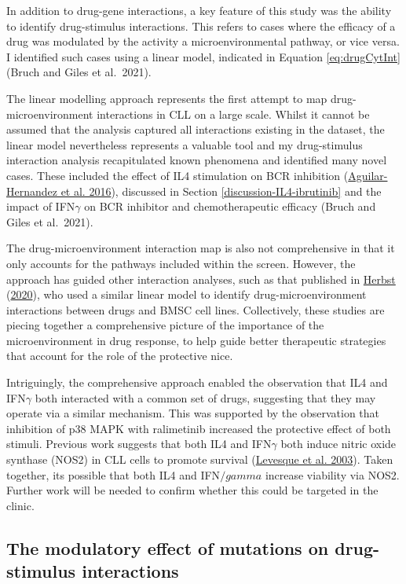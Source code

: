 \documentclass[11pt, a4paper, twosided]{book}
\begin{document}
In addition to drug-gene interactions, a key feature of this study was the ability to identify drug-stimulus interactions. This refers to cases where the efficacy of a drug was modulated by the activity a microenvironmental pathway, or vice versa. I identified such cases using a linear model, indicated in Equation \eqref{eq:drugCytInt} (Bruch and Giles et al.~2021).

The linear modelling approach represents the first attempt to map drug-microenvironment interactions in CLL on a large scale. Whilst it cannot be assumed that the analysis captured all interactions existing in the dataset, the linear model nevertheless represents a valuable tool and my drug-stimulus interaction analysis recapitulated known phenomena and identified many novel cases. These included the effect of IL4 stimulation on BCR inhibition (\protect\hyperlink{ref-AguilarHernandez2016}{Aguilar-Hernandez et al. 2016}), discussed in Section \ref{discussion-IL4-ibrutinib} and the impact of IFN\(\gamma\) on BCR inhibitor and chemotherapeutic efficacy (Bruch and Giles et al.~2021).

The drug-microenvironment interaction map is also not comprehensive in that it only accounts for the pathways included within the screen. However, the approach has guided other interaction analyses, such as that published in \protect\hyperlink{ref-HerbstThesis}{Herbst} (\protect\hyperlink{ref-HerbstThesis}{2020}), who used a similar linear model to identify drug-microenvironment interactions between drugs and BMSC cell lines. Collectively, these studies are piecing together a comprehensive picture of the importance of the microenvironment in drug response, to help guide better therapeutic strategies that account for the role of the protective nice.

Intriguingly, the comprehensive approach enabled the observation that IL4 and IFN\(\gamma\) both interacted with a common set of drugs, suggesting that they may operate via a similar mechanism. This was supported by the observation that inhibition of p38 MAPK with ralimetinib increased the protective effect of both stimuli. Previous work suggests that both IL4 and IFN\(\gamma\) both induce nitric oxide synthase (NOS2) in CLL cells to promote survival (\protect\hyperlink{ref-Levesque2003}{Levesque et al. 2003}). Taken together, its possible that both IL4 and IFN\(/gamma\) increase viability via NOS2. Further work will be needed to confirm whether this could be targeted in the clinic.

\hypertarget{the-modulatory-effect-of-mutations-on-drug-stimulus-interactions}{%
\subsection{The modulatory effect of mutations on drug-stimulus interactions}\label{the-modulatory-effect-of-mutations-on-drug-stimulus-interactions}}
\end{document}
